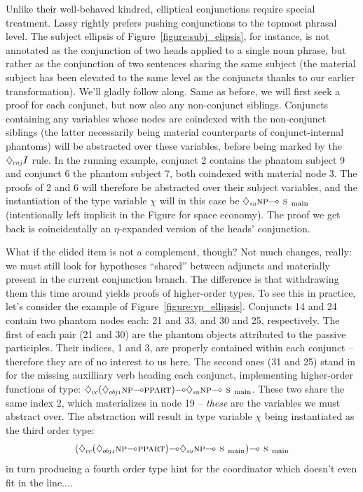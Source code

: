 Unlike their well-behaved kindred, elliptical conjunctions require special treatment.
Lassy rightly prefers pushing conjunctions to the topmost phrasal level.
The subject ellipsis of Figure~\ref{figure:subj_elipsis}, for instance, is not annotated as the conjunction of two heads applied to a single noun phrase, but rather as the conjunction of two sentences sharing the same subject (the material subject has been elevated to the same level as the conjuncts thanks to our earlier transformation).
We'll gladly follow along.
Same as before, we will first seek a proof for each conjunct, but now also any non-conjunct siblings. %
Conjuncts containing any variables whose nodes are coindexed with the non-conjunct siblings (the latter necessarily being material counterparts of conjunct-internal phantoms) will be abstracted over these variables, before being marked by the $\ddia{cnj} I$ rule.
In the running example,  conjunct 2 contains the phantom subject 9 and conjunct 6 the phantom subject 7, both coindexed with material node 3.
The proofs of 2 and 6 will therefore be abstracted over their subject variables, and the instantiation of the type variable $\chi$ will in this case be $\ddia{su}\np[s]\li\smain[s]$ (intentionally left implicit in the Figure for space economy).
The proof we get back is coincidentally an $\eta$-expanded version of the heads' conjunction.

What if the elided item is not a complement, though?
Not much changes, really: we must still look for hypotheses ``shared'' between adjuncts and materially present in the current conjunction branch.
The difference is that withdrawing them this time around yields proofs of higher-order types.
To see this in practice, let's consider the example of Figure~\ref{figure:vp_ellipsis}.%
Conjuncts 14 and 24 contain two phantom nodes each: 21 and 33, and 30 and 25, respectively.
The first of each pair (21 and 30) are the phantom objects attributed to the passive participles.
Their indices, 1 and 3, are properly contained within each conjunct -- therefore they are of no interest to us here.
The second ones (31 and 25) stand in for the missing auxilliary verb heading each conjunct, implementing higher-order functions of type:
$\ddia{vc}(\ddia{obj1}\np[s]\li\ppart[s])\li\ddia{su}\np[s]\li\smain[s]$.
These two share the same index 2, which materializes in node 19 -- \textit{these} are the variables we must abstract over.
The abstraction will result in type variable $\chi$ being instantiated as the third order type:
\begin{equation*}
(\ddia{vc}(\ddia{obj1}\np[s]\li\ppart[s])\li\ddia{su}\np[s]\li\smain[s])\li\smain
\end{equation*}
in turn producing a fourth order type hint for the coordinator which doesn't even fit in the line....

